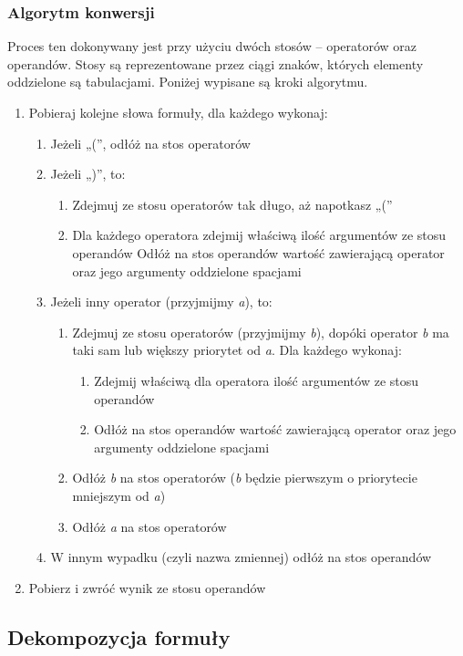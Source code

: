 \documentclass[12pt,a4paper,titlepage]{article}
\begin{document}
\subsubsection{Algorytm konwersji}
Proces ten dokonywany jest przy użyciu dwóch stosów – operatorów oraz operandów. Stosy są reprezentowane przez ciągi znaków, których elementy oddzielone są tabulacjami. Poniżej wypisane są kroki algorytmu.
\begin{enumerate}
	\item Pobieraj kolejne słowa formuły, dla każdego wykonaj:
	\begin{enumerate}
		\item Jeżeli „(”, odłóż na stos operatorów
		\item Jeżeli „)”, to:
		\begin{enumerate}
			\item Zdejmuj ze stosu operatorów tak długo, aż napotkasz „(”
			\item Dla każdego operatora zdejmij właściwą ilość argumentów ze stosu operandów Odłóż na stos operandów wartość zawierającą operator oraz jego argumenty oddzielone spacjami
		\end{enumerate}
		\item Jeżeli inny operator (przyjmijmy \textit{a}), to:
		\begin{enumerate}
			\item Zdejmuj ze stosu operatorów (przyjmijmy \textit{b}), dopóki operator \textit{b} ma taki sam lub większy priorytet od \textit{a}. Dla każdego wykonaj:
			\begin{enumerate}
				\item Zdejmij właściwą dla operatora ilość argumentów ze stosu operandów
				\item Odłóż na stos operandów wartość zawierającą operator oraz jego argumenty oddzielone spacjami
			\end{enumerate}
			\item Odłóż \textit{b} na stos operatorów (\textit{b} będzie pierwszym o priorytecie mniejszym od \textit{a})
			\item Odłóż \textit{a} na stos operatorów
		\end{enumerate}
		\item W innym wypadku (czyli nazwa zmiennej) odłóż na stos operandów
	\end{enumerate}
	\item Pobierz i zwróć wynik ze stosu operandów
\end{enumerate}

\subsection{Dekompozycja formuły}
\end{document}
